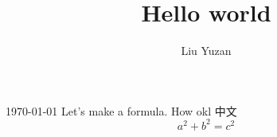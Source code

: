 \documentclass{article}
\begin{document}
    \title{Hello world}
    \author{Liu Yuzan}

    \maketitle
    \today  
    Let's make a formula. How okl 中文
    \[
        a^2 + b^2 = c^2
    \]
\end{document}
